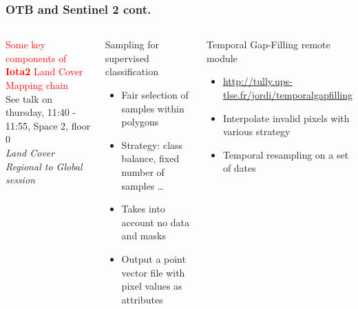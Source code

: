 \documentclass[8pt,aspectratio=169]{beamer}
\begin{document}
      \begin{frame}
        \frametitle{OTB and Sentinel 2 cont.}
        \begin{columns}

          \begin{center}
          \textcolor{red}{Some key components of \textbf{Iota2} Land Cover Mapping chain}\\
          \small{See talk on thursday, 11:40 - 11:55, Space 2, floor 0\\ \emph{Land Cover Regional to Global session}}
          \end{center}

          \begin{block}{Sampling for supervised classification}
            \begin{itemize}
            \item Fair selection of samples within polygons
            \item Strategy: class balance, fixed number of samples \ldots
            \item Takes into account no data and masks
            \item Output a point vector file with pixel values as attributes
            \end{itemize}
        \end{block}
        
        \begin{block}{Temporal Gap-Filling remote module}
          \begin{itemize}
          \item \small{\url{http://tully.ups-tlse.fr/jordi/temporalgapfilling}}
          \item Interpolate invalid pixels with various strategy
          \item Temporal resampling on a set of dates
          \end{itemize}
          
        \end{block}
        

\end{columns}
\end{frame}
\end{document}

